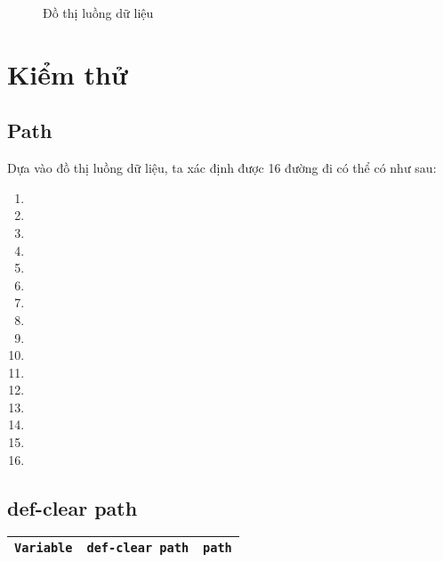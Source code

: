 \documentclass{article}
\begin{document}
\begin{figure}[htp]
    \centering
    \caption{Đồ thị luồng dữ liệu}
\end{figure}

\section{Kiểm thử}

\subsection*{Path}

\par Dựa vào đồ thị luồng dữ liệu, ta xác định được 16 đường đi có thể có như sau:
\bigskip

\begin{enumerate}[label = (Path \arabic*),itemindent=1cm]
    \item 
    \item 
    \item 
    \item 
    \item 
    \item 
    \item 
    \item 
    \item 
    \item 
    \item 
    \item 
    \item 
    \item 
    \item 
    \item 
\end{enumerate}

\subsection*{def-clear path}

\begin{table}[htp]
    \centering
    \begin{tabular}{l|c|c}
        \texttt{Variable}                      & \texttt{def-clear path}                          & \texttt{path}                  \\
        \toprule
        \bottomrule
    \end{tabular}
\end{table}
\end{document}
